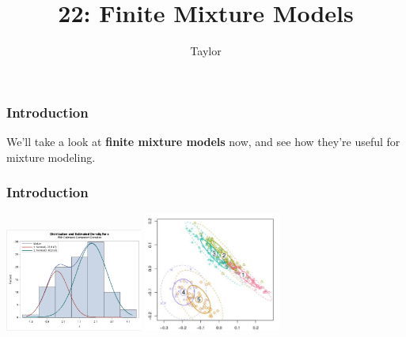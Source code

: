\documentclass{beamer}
\title["22"]{22: Finite Mixture Models}
\author{Taylor}
\institute[UVA] 
{
University of Virginia \\
\medskip
\textit{} 
}
\date{}
\begin{document}

\begin{frame}
\titlepage 
\end{frame}

\begin{frame}
\frametitle{Introduction}

We'll take a look at {\bf finite mixture models} now, and see how they're useful for mixture modeling.

\end{frame}

\begin{frame}
\frametitle{Introduction}

\begin{center}
\includegraphics[width=45mm]{mixpic1.png}
\includegraphics[width=45mm]{mixpic2.png}
\end{center}

\end{frame}
\end{document}
